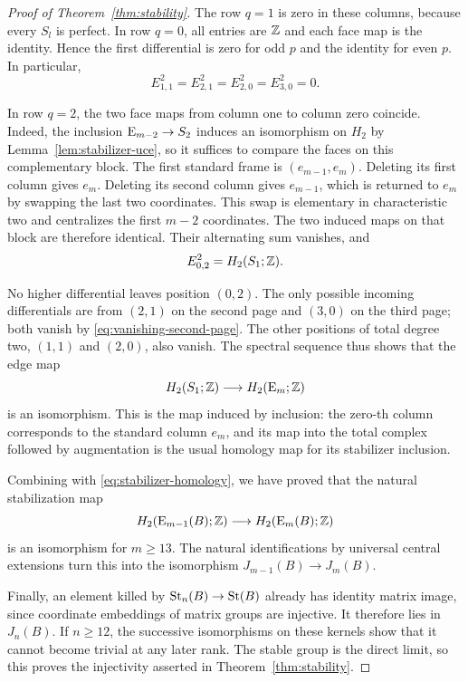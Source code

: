 \begin{proof}[Proof of Theorem~\ref{thm:stability}]
The row $q=1$ is zero in these columns, because every $S_l$ is
perfect. In row $q=0$, all entries are $\mathbb Z$ and each face map is
the identity. Hence the first differential is zero for odd $p$ and
the identity for even $p$. In particular,
\begin{equation}\label{eq:vanishing-second-page}
 E^2_{1,1}=E^2_{2,1}=E^2_{2,0}=E^2_{3,0}=0.
\end{equation}

In row $q=2$, the two face maps from column one to column zero
coincide. Indeed, the inclusion $\operatorname{E}_{m-2}\to S_2$ induces an
isomorphism on $H_2$ by Lemma~\ref{lem:stabilizer-uce}, so it
suffices to compare the faces on this complementary block.
The first standard frame is $(e_{m-1},e_m)$. Deleting its first
column gives $e_m$. Deleting its second column gives $e_{m-1}$,
which is returned to $e_m$ by swapping the last two coordinates.
This swap is elementary in characteristic two and centralizes the
first $m-2$ coordinates. The two induced maps on that block are
therefore identical. Their alternating sum vanishes, and
\[
 E^2_{0,2}=H_2(S_1;\mathbb Z).
\]

No higher differential leaves position $(0,2)$. The only possible
incoming differentials are from $(2,1)$ on the second page and
$(3,0)$ on the third page; both vanish by
\eqref{eq:vanishing-second-page}. The other positions of total
degree two, $(1,1)$ and $(2,0)$, also vanish. The spectral sequence
thus shows that the edge map
\[
 H_2(S_1;\mathbb Z)\longrightarrow H_2(\operatorname{E}_m;\mathbb Z)
\]
is an isomorphism. This is the map induced by inclusion: the
zero-th column corresponds to the standard column $e_m$, and its
map into the total complex followed by augmentation is the usual
homology map for its stabilizer inclusion.

Combining with \eqref{eq:stabilizer-homology}, we have proved that
the natural stabilization map
\[
 H_2(\operatorname{E}_{m-1}(B);\mathbb Z)\longrightarrow H_2(\operatorname{E}_m(B);\mathbb Z)
\]
is an isomorphism for $m\geq13$. The natural identifications by
universal central extensions turn this into the isomorphism
$J_{m-1}(B)\to J_m(B)$.

Finally, an element killed by $\operatorname{St}_n(B)\to\operatorname{St}(B)$ already has
identity matrix image, since coordinate embeddings of matrix groups
are injective. It therefore lies in $J_n(B)$. If $n\geq12$, the
successive isomorphisms on these kernels show that it cannot become
trivial at any later rank. The stable group is the direct limit, so
this proves the injectivity asserted in
Theorem~\ref{thm:stability}.
\end{proof}
